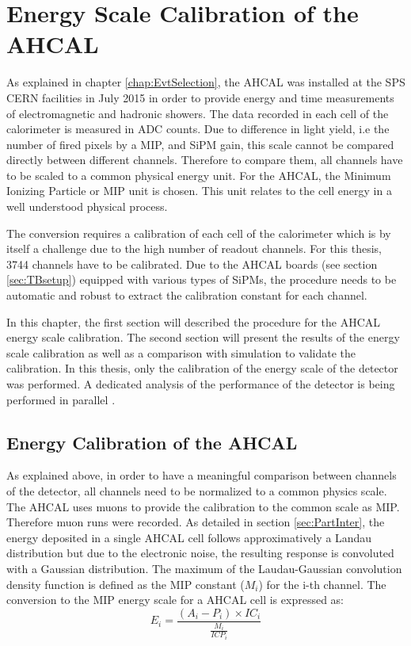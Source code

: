 \chapter{Energy Scale Calibration of the AHCAL}
\label{chap:ECalibAHCAL}

As explained in chapter \ref{chap:EvtSelection}, the AHCAL was installed at the SPS CERN facilities in July 2015 in order to provide energy and time measurements of electromagnetic and hadronic showers. The data recorded in each cell of the calorimeter is measured in ADC counts. Due to difference in light yield, i.e the number of fired pixels by a MIP, and SiPM gain, this scale cannot be compared directly between different channels. Therefore to compare them, all channels have to be scaled to a common physical energy unit. For the AHCAL, the Minimum Ionizing Particle or MIP unit is chosen. This unit relates to the cell energy in a well understood physical process.

The conversion requires a calibration of each cell of the calorimeter which is by itself a challenge due to the high number of readout channels. For this thesis, 3744 channels have to be calibrated. Due to the AHCAL boards (see section \ref{sec:TBsetup}) equipped with various types of SiPMs, the procedure needs to be automatic and robust to extract the calibration constant for each channel.

In this chapter, the first section will described the procedure for the AHCAL energy scale calibration. The second section will present the results of the energy scale calibration as well as a comparison with simulation to validate the calibration. In this thesis, only the calibration of the energy scale of the detector was performed. A dedicated analysis of the performance of the detector is being performed in parallel \cite{AmbraEnergy, AmbraTokyo}.

\section{Energy Calibration of the AHCAL}
\label{sec:EnergyCalibration}

As explained above, in order to have a meaningful comparison between channels of the detector, all channels need to be normalized to a common physics scale. The AHCAL uses muons to provide the calibration to the common scale as MIP. Therefore muon runs were recorded. As detailed in section \ref{sec:PartInter}, the energy deposited in a single AHCAL cell follows approximatively a Landau distribution but due to the electronic noise, the resulting response is convoluted with a Gaussian distribution. The maximum of the Laudau-Gaussian convolution density function is defined as the MIP constant ($M_{i}$) for the i-th channel. The conversion to the MIP energy scale for a AHCAL cell is expressed as:
\begin{equation}
	E_i = \frac{(A_i - P_i) \times IC_i }{\frac{M_{i}}{ICP_i}}
\end{equation}

